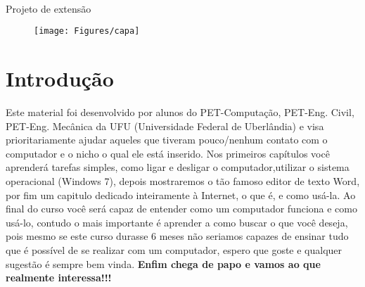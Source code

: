 \documentclass[hidelinks,12pt]{article}
\newcommand{\bigicon}[1]{\texttt{[image: \#1]}}
\newcommand{\iconb}[1]{\texttt{[image: \#1]}}
\begin{document}
\pagestyle{fancy}


\begin{center}
	\\
	\vspace{0.5cm}\large{Projeto de extensão}
\end{center}

\lhead{\bigicon{Figures/ufu}}
\rhead{\bigicon{Figures/facom}}
\lfoot{}
\cfoot{}
\rfoot{}
\vspace{1cm}
\begin{figure}[!h]
	\centering
	\texttt{[image: Figures/capa]}

\end{figure}


\newpage
\fancyhead[C]{}
\fancyhead[R]{\iconb{Figures/comppet}}
\fancyhead[L]{\leftmark}
\fancyfoot{}
\fancyfoot[C]{\hspace{3.0cm}\thepage}


\tableofcontents
\listoffigures

{\let\thefootnote\relax{}}

{\let\thefootnote\relax{}}


{\let\thefootnote\relax{}}


\newpage

\section{Introdução}

 Este material foi desenvolvido por alunos do PET-Computação, PET-Eng. Civil, PET-Eng. Mecânica da UFU (Universidade Federal de Uberlândia) e visa prioritariamente ajudar aqueles que tiveram pouco/nenhum contato com o computador e o nicho o qual ele
			está inserido. Nos primeiros capítulos você aprenderá tarefas simples, como ligar e desligar o computador,utilizar o sistema operacional (Windows 7), depois mostraremos o tão famoso editor de texto Word, por fim um capitulo dedicado inteiramente à Internet, o que é, e como usá-la.
 Ao final do curso você será capaz de entender como um computador funciona e como usá-lo, contudo o mais importante
			é aprender a como buscar o que você deseja, pois mesmo se este curso durasse 6 meses não seriamos capazes
			de ensinar tudo que é possível de se realizar com um computador, espero que goste e qualquer sugestão é sempre bem vinda. \textbf{Enfim chega de papo e vamos ao que realmente interessa!!!}
\end{document}
